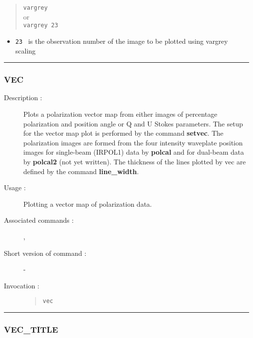 \begin{description}
\begin{quote}{\tt  vargrey }\\
or \\
{\tt vargrey 23 }
\end{quote}

\begin{itemize}

\item {\tt 23 } is the observation number of the image to be plotted
 using vargrey scaling
\end{itemize}

\end{description}

\hrule
\subsubsection*{\label{VEC}VEC}

\begin{description}

\item[Description :] Plots a polarization vector map from either images
of percentage polarization and position angle or Q and U Stokes
parameters.  The setup for the vector map plot is performed by the
command {\bf setvec}.  The polarization images are formed from the four
intensity waveplate position images for single-beam (IRPOL1) data by
{\bf polcal} and for dual-beam data by {\bf polcal2} (not yet
written).  The thickness of the lines plotted by vec are defined by the
command {\bf line\_width}.

\item[Usage :] Plotting a vector map of polarization data.
\item[Associated commands :] {\tt {}},
{\tt {}}
\item[Short version of command :] -
\item[Invocation :]

\begin{quote}{\tt  vec }\end{quote}

\end{description}

\hrule
\subsubsection*{\label{VEC_TITLE}VEC\_TITLE}

